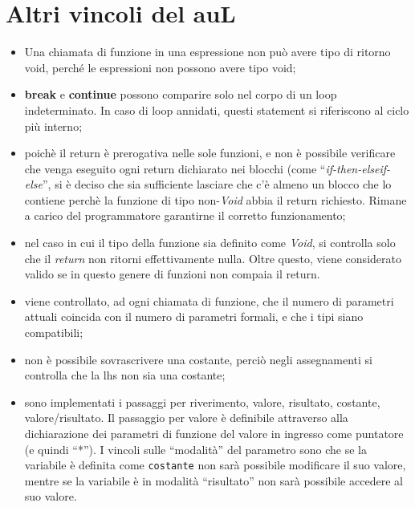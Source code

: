 \documentclass{article}
\begin{document}
\section{Altri vincoli del auL}
\begin{itemize}
	\item Una chiamata di funzione in una espressione non può avere tipo di
		ritorno void, perché le espressioni non possono avere tipo void;
	
	\item \textbf{break} e \textbf{continue} possono comparire solo nel corpo di un loop indeterminato.
		In caso di loop annidati, questi statement si riferiscono al ciclo più interno;
	
	\item poichè il return è prerogativa nelle sole funzioni, e non è possibile verificare che
		venga eseguito ogni return dichiarato nei blocchi (come ``\textit{if-then-elseif-else}'',
		si è deciso che sia sufficiente lasciare che c'è almeno un blocco che lo contiene perchè
		la funzione di tipo non-\textit{Void} abbia il return richiesto. Rimane a carico del programmatore
		garantirne il corretto funzionamento;

	\item nel caso in cui il tipo della funzione sia definito come \textit{Void}, si controlla solo che
		il \textit{return} non ritorni effettivamente nulla. Oltre questo, viene considerato valido se
		in questo genere di funzioni non compaia il return.
	
	\item viene controllato, ad ogni chiamata di funzione, che il numero di parametri
		attuali coincida con il numero di parametri formali, e che i tipi
		siano compatibili;
		
	\item non è possibile sovrascrivere una costante, perciò negli assegnamenti
		si controlla che la lhs non sia una costante;
	
	\item sono implementati i passaggi per riverimento, valore, risultato, costante, valore/risultato.
		Il passaggio per valore è definibile attraverso alla dichiarazione dei parametri di funzione
		del valore in ingresso come puntatore (e quindi ``*''). I vincoli sulle ``modalità'' del parametro
		sono che se la variabile è definita come \texttt{costante} non sarà possibile modificare il suo
		valore, mentre se la variabile è in modalità ``risultato'' non sarà possibile accedere al suo valore.
\end{itemize}
\end{document}

